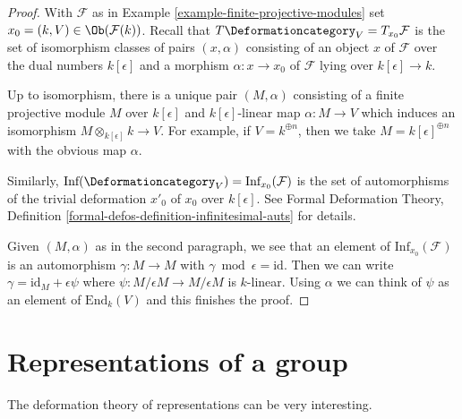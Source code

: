 \begin{proof}
With $\mathcal{F}$ as in Example \ref{example-finite-projective-modules}
set $x_0 = (k, V) \in \Ob(\mathcal{F}(k))$.
Recall that $T\Deformationcategory_V = T_{x_0}\mathcal{F}$
is the set of isomorphism
classes of pairs $(x, \alpha)$ consisting of an object $x$ of $\mathcal{F}
$ over the dual numbers $k[\epsilon]$ and a morphism
$\alpha : x \to x_0$ of $\mathcal{F}$ lying over $k[\epsilon] \to k$.

\medskip\noindent
Up to isomorphism, there is a unique pair $(M, \alpha)$ consisting of a
finite projective module $M$ over $k[\epsilon]$
and $k[\epsilon]$-linear map $\alpha : M \to V$
which induces an isomorphism $M \otimes_{k[\epsilon]} k \to V$.
For example, if $V = k^{\oplus n}$, then we take
$M = k[\epsilon]^{\oplus n}$ with the obvious map $\alpha$.

\medskip\noindent
Similarly, $\text{Inf}(\Deformationcategory_V) = \text{Inf}_{x_0}(\mathcal{F})$
is the set of automorphisms
of the trivial deformation $x'_0$ of $x_0$ over $k[\epsilon]$.
See Formal Deformation Theory, Definition
\ref{formal-defos-definition-infinitesimal-auts} for details.

\medskip\noindent
Given $(M, \alpha)$ as in the second paragraph, we see that an element of
$\text{Inf}_{x_0}(\mathcal{F})$ is an automorphism $\gamma : M \to M$ with
$\gamma \bmod \epsilon = \text{id}$. Then we can write
$\gamma = \text{id}_M + \epsilon \psi$ where
$\psi : M/\epsilon M \to M/\epsilon M$ is $k$-linear.
Using $\alpha$ we can think of $\psi$ as an element of
$\text{End}_k(V)$ and this finishes the proof.
\end{proof}


\section{Representations of a group}
\label{section-representations}

\noindent
The deformation theory of representations can be very interesting.

